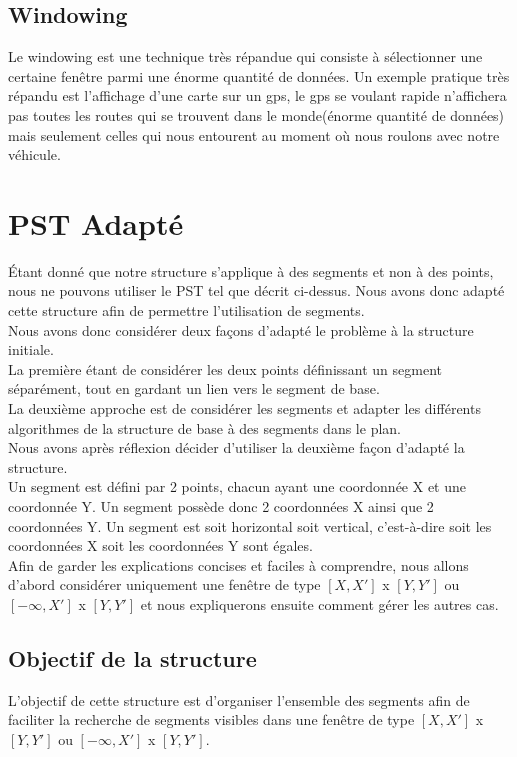 \documentclass[10pt,a4paper]{article}
\begin{document}

\subsection{Windowing}
Le windowing est une technique très répandue qui consiste à sélectionner une certaine fenêtre parmi une énorme quantité de données. Un exemple pratique très répandu est l'affichage d'une carte sur un gps, le gps se voulant rapide n'affichera pas toutes les routes qui se trouvent dans le monde(énorme quantité de données) mais seulement celles qui nous entourent au moment où  nous roulons avec notre véhicule.


\newpage
\section{PST Adapté}

Étant donné que notre structure s'applique à des segments et non à des points, nous ne pouvons utiliser le PST tel que décrit ci-dessus. Nous avons donc adapté cette structure afin de permettre l'utilisation de segments.\\

Nous avons donc considérer deux façons d'adapté le problème à la structure initiale.\\La première étant de considérer les deux points définissant un segment séparément, tout en gardant un lien vers le segment de base.\\La deuxième approche est de considérer les segments et adapter les différents algorithmes de la structure de base à des segments dans le plan.\\Nous avons après réflexion décider d'utiliser la deuxième façon d'adapté la structure.\\

Un segment est défini par 2 points, chacun ayant une coordonnée X et une coordonnée Y. Un segment possède donc 2 coordonnées X ainsi que 2 coordonnées Y. Un segment est soit horizontal soit vertical, c'est-à-dire soit les coordonnées X soit les coordonnées Y sont égales.\\
Afin de garder les explications concises et faciles à comprendre, nous allons d'abord considérer uniquement une fenêtre de type $[X, X']$ x $[Y, Y']$ ou $[-\infty, X']$ x $[Y, Y']$ et nous expliquerons ensuite comment gérer les autres cas.

\subsection{Objectif de la structure}
L'objectif de cette structure est d'organiser l'ensemble des segments afin de faciliter la recherche de segments visibles dans une fenêtre de type $[X, X']$ x $[Y, Y']$ ou $[-\infty, X']$ x $[Y, Y']$.
\end{document}
